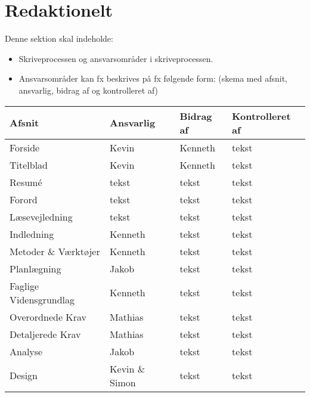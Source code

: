 \section{Redaktionelt}
Denne sektion skal indeholde:

\begin{itemize}
    \item Skriveprocessen og ansvarsområder i skriveprocessen.
    \item Ansvarsområder kan fx beskrives på fx følgende form: (skema med afsnit, ansvarlig, bidrag af og kontrolleret af)
\end{itemize}{}

\begin{table}[H] %
    \begin{tabularx}{\textwidth}{|p{7cm}|X|X|X|}
        \hline
        \textbf{Afsnit}                     &  \textbf{Ansvarlig}  & \textbf{Bidrag af} & \textbf{Kontrolleret af}\\
        \hline
        Forside                             & Kevin & Kenneth & tekst \\
        \hline
        Titelblad                           & Kevin & Kenneth & tekst \\
        \hline
        Resumé                              & tekst & tekst & tekst \\
        \hline
        Forord                              & tekst & tekst & tekst \\
        \hline
        Læsevejledning                      & tekst & tekst & tekst \\
        \hline
        Indledning                          & Kenneth & tekst & tekst \\
        \hline
        Metoder \& Værktøjer                & Kenneth & tekst & tekst \\
        \hline
        Planlægning                         & Jakob & tekst & tekst \\
        \hline
        Faglige Vidensgrundlag              & Kenneth & tekst & tekst \\
        \hline
        Overordnede Krav                    & Mathias & tekst & tekst \\
        \hline
        Detaljerede Krav                    & Mathias & tekst & tekst \\
        \hline
        Analyse                             & Jakob & tekst & tekst \\
        \hline
        Design                              & Kevin \& Simon & tekst & tekst \\

\end{tabularx}
\end{table}

